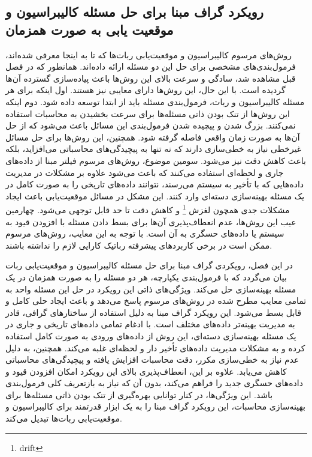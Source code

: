\subsection{رویکرد گراف مبنا برای حل مسئله کالیبراسیون و موقعیت یابی به صورت همزمان}
روش‌های مرسوم کالیبراسیون و موقعیت‌یابی ربات‌ها که تا به اینجا معرفی شده‌اند، فرمول‌بندی‌های مشخصی برای حل این دو مسئله ارائه داده‌اند. همانطور که در فصل قبل مشاهده شد، سادگی و سرعت بالای این روش‌ها باعث پیاده‌سازی گسترده آن‌ها گردیده است. با این حال، این روش‌ها دارای معایبی نیز هستند. 
اول اینکه برای هر مسئله کالیبراسیون و ربات، فرمول‌بندی مسئله باید از ابتدا توسعه داده شود. دوم اینکه  این روش‌ها از تنک بودن ذاتی مسئله‌ها برای سرعت بخشیدن به محاسبات استفاده نمی‌کنند.  بزرگ شدن و پیچیده شدن فرمول‌بندی این مسائل باعث می‌شود که از حل آن‌ها به صورت زمان واقعی فاصله گرفته شود.  همچنین، این روش‌ها برای حل مسائل غیرخطی نیاز به خطی‌سازی دارند که نه تنها به پیچیدگی‌های محاسباتی می‌افزاید، بلکه باعث کاهش دقت نیز می‌شود. 
سومین موضوع،  روش‌های مرسوم فیلتر مبنا از داده‌های جاری و لحظه‌ای استفاده می‌کنند که باعث می‌شود علاوه بر مشکلات در مدیریت داده‌هایی که با تأخیر به سیستم می‌رسند، نتوانند داده‌های تاریخی را به صورت کامل در یک مسئله بهینه‌سازی دسته‌ای وارد کنند. این مشکل در مسائل موقعیت‌یابی باعث ایجاد مشکلات جدی همچون لغزش
\footnote{drift}
و کاهش دقت تا حد قابل توجهی می‌شود. چهارمین عیب این روش‌ها، عدم انعطاف‌پذیری آن‌ها برای بسط دادن مسئله با افزودن قیود به سیستم یا داده‌های حسگری به آن است. با توجه به این معایب، روش‌های مرسوم ممکن است در برخی کاربردهای پیشرفته رباتیک کارایی لازم را نداشته باشند. 

در این فصل، رویکردی گراف مبنا برای حل مسئله کالیبراسیون و موقعیت‌یابی ربات بیان می‌گردد که با فرمول‌بندی یکپارچه، هر دو مسئله را به صورت همزمان در یک مسئله بهینه‌سازی حل می‌کند. ویژگی‌های ذاتی این رویکرد در حل این مسئله واحد به تمامی معایب مطرح شده در روش‌های مرسوم پاسخ می‌دهد و باعث ایجاد حلی کامل و قابل بسط می‌شود. این رویکرد گراف مبنا به دلیل استفاده از ساختارهای گرافی، قادر به مدیریت بهینه‌تر داده‌های مختلف است. با ادغام تمامی داده‌های تاریخی و جاری در یک مسئله بهینه‌سازی دسته‌ای، این روش از داده‌های ورودی به صورت کامل استفاده کرده و به مشکلات مدیریت داده‌های تأخیر دار و لحظه‌ای غلبه می‌کند. همچنین، به دلیل عدم نیاز به خطی‌سازی مکرر، دقت محاسبات افزایش یافته و پیچیدگی‌های محاسباتی کاهش می‌یابد. علاوه بر این، انعطاف‌پذیری بالای این رویکرد امکان افزودن قیود و داده‌های حسگری جدید را فراهم می‌کند، بدون آن که نیاز به بازتعریف کلی فرمول‌بندی باشد. این ویژگی‌ها، در کنار توانایی بهره‌گیری از تنک بودن ذاتی مسئله‌ها برای بهینه‌سازی محاسبات، این رویکرد گراف مبنا را به یک ابزار قدرتمند برای کالیبراسیون و موقعیت‌یابی ربات‌ها تبدیل می‌کند.

